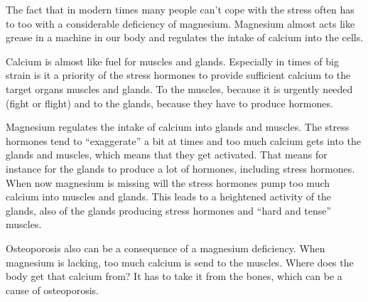 \documentclass[../main.tex]{subfiles}
\begin{document}
The fact that in modern times many people can't cope with the stress often has to too with a
considerable deficiency of magnesium.
Magnesium almost acts like grease in a machine in our body and regulates the intake of calcium into the cells.

Calcium is almost like fuel for muscles and glands.
Especially in times of big strain is it a priority of the stress hormones to provide sufficient calcium to the target organs muscles and glands.
To the muscles, because it is urgently needed (fight or flight) and to the glands,
because they have to produce hormones.

Magnesium regulates the intake of calcium into glands and muscles.
The stress hormones tend to ``exaggerate'' a bit at times and too much calcium gets into the glands and muscles,
which means that they get activated.
That means for instance for the glands to produce a lot of hormones, including stress hormones.
When now magnesium is missing will the stress hormones pump too much calcium into muscles and glands.
This leads to a heightened activity of the glands,
also of the glands producing stress hormones and ``hard and tense'' muscles.

Osteoporosis also can be a consequence of a magnesium deficiency.
When magnesium is lacking, too much calcium is send to the muscles.
Where does the body get that calcium from?
It has to take it from the bones, which can be a cause of osteoporosis.
\end{document}
